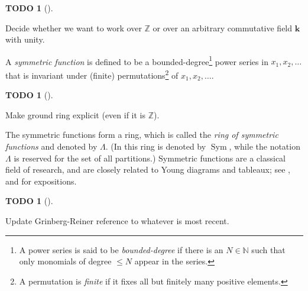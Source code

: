 \documentclass[numbers=enddot,12pt,final,onecolumn,notitlepage]{scrartcl}%
\theoremstyle{definition}
\newtheorem{quest}[theo]{TODO}
\newenvironment{todo}[1][]
{\begin{quest}[#1]\begin{leftbar}}
{\end{leftbar}\end{quest}}
\def\Z{\mathbb{Z}}
\begin{document}
\begin{comment}
The \textit{symmetric functions} over $\mathbf{k}$ are defined to be the
symmetric bounded-degree power series $f\in\mathbf{k}\left[  \left[
x_{1},x_{2},x_{3},\ldots\right]  \right]  $. They form a $\mathbf{k}%
$-subalgebra of $\mathbf{k}\left[  \left[  x_{1},x_{2},x_{3},\ldots\right]
\right]  $. This $\mathbf{k}$-subalgebra is called the \textit{ring of
symmetric functions over }$\mathbf{k}$; it will be denoted by $\Lambda$ or
(when $\mathbf{k}$ is not clear from the context) by $\Lambda_{\mathbf{k}}$.
(The reader shall be warned that \cite{LamPyl} denotes this $\mathbf{k}%
$-algebra by $\operatorname*{Sym}$, while using the notation $\Lambda$ for the
set of all partitions.) Symmetric functions are a classical
field of research, and are closely related to Young diagrams and tableaux; see
\cite[Chapter 7]{Stan99}, \cite{Macdon95} and \cite[Chapter 2]{GriRei15} for expositions.
\end{comment}

\begin{todo}
 Decide whether we want to work over $\Z$ or over an arbitrary commutative field $\mathbf{k}$ with unity. 
\end{todo}


A \textit{symmetric function} is defined to be a
bounded-degree\footnote{A power series is said to be \textit{bounded-degree}
if there is an $N \in \mathbb{N}$ such that only monomials of degree $\leq N$
appear in the series.}
power series in $x_1,x_2,\dots$ that is invariant under (finite)
permutations\footnote{A permutation is \textit{finite} if it fixes all but
finitely many positive elements.} of $x_1,x_2,\dots$.

\begin{todo}
 Make ground ring explicit (even if it is $\Z$).
\end{todo}

The symmetric functions form a ring, which is called the \textit{ring of
symmetric functions} and denoted by $\Lambda$.
(In \cite{LamPyl} this ring is denoted by $\operatorname*{Sym}$, while the notation $\Lambda$ is reserved for the
set of all partitions.) Symmetric functions are a classical
field of research, and are closely related to Young diagrams and tableaux; see
\cite[Chapter 7]{Stan99}, \cite{Macdon95} and \cite[Chapter 2]{GriRei15} for expositions. 


\begin{todo}
Update Grinberg-Reiner reference to whatever is most recent.
\end{todo}
\end{document}
